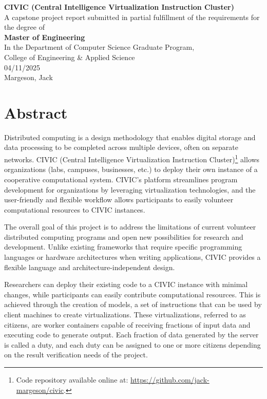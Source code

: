\documentclass[11pt]{article}
\begin{document}
\thispagestyle{empty}
\begin{titlepage}
    \begin{center}
        \textbf{\Large CIVIC (Central Intelligence Virtualization Instruction Cluster)} \\[1cm]
        A capstone project report submitted in partial fulfillment of the requirements for the degree of \\[1cm]
        \textbf{\Large Master of Engineering} \\[1cm] 
        In the Department of Computer Science Graduate Program, \\
        College of Engineering \& Applied Science \\[1cm]
        04/11/2025 \\[1cm]
        Margeson, Jack
    \end{center}
\end{titlepage}

\setcounter{page}{2}
\section{Abstract}

Distributed computing is a design methodology that enables digital storage and data processing to be completed across multiple devices, often on separate networks. CIVIC (Central Intelligence Virtualization Instruction Cluster)\footnote{Code repository available online at: \url{https://github.com/jack-margeson/civic}.} allows organizations (labs, campuses, businesses, etc.) to deploy their own instance of a cooperative computational system. CIVIC’s platform streamlines program development for organizations by leveraging virtualization technologies, and the user-friendly and flexible workflow allows participants to easily volunteer computational resources to CIVIC instances.

The overall goal of this project is to address the limitations of current volunteer distributed computing programs and open new possibilities for research and development. Unlike existing frameworks that require specific programming languages or hardware architectures when writing applications, CIVIC provides a flexible language and architecture-independent design.

Researchers can deploy their existing code to a CIVIC instance with minimal changes, while participants can easily contribute computational resources. This is achieved through the creation of models, a set of instructions that can be used by client machines to create virtualizations. These virtualizations, referred to as citizens, are worker containers capable of receiving fractions of input data and executing code to generate output. Each fraction of data generated by the server is called a duty, and each duty can be assigned to one or more citizens depending on the result verification needs of the project.
\end{document}
